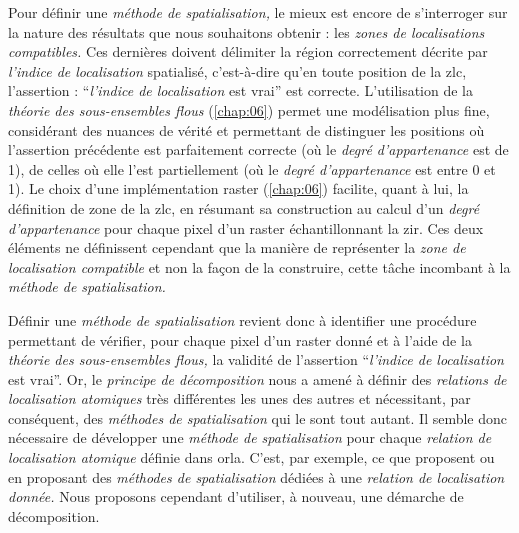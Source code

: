 Pour définir une \emph{méthode de spatialisation,} le mieux est encore
de s’interroger sur la nature des résultats que nous souhaitons
obtenir : les \emph{zones de localisations compatibles.} Ces dernières
doivent délimiter la région correctement décrite par \emph{l'indice de
  localisation} spatialisé, c'est-à-dire qu'en toute position de la
\ac{zlc}, l'assertion : \enquote{\emph{l'indice de localisation} est
  vrai} est correcte. L'utilisation de la \emph{théorie des
  sous-ensembles flous} (\autoref{chap:06}) permet une modélisation
plus fine, considérant des nuances de vérité et permettant de
distinguer les positions où l'assertion précédente est parfaitement
correcte (\ie où le \emph{degré d'appartenance} est de 1), de celles
où elle l'est partiellement (\ie où le \emph{degré d'appartenance} est
entre 0 et 1). Le choix d'une implémentation raster
(\autoref{chap:06}) facilite, quant à lui, la définition de zone de la
\ac{zlc}, en résumant sa construction au calcul d'un \emph{degré
  d'appartenance} pour chaque pixel d'un raster échantillonnant la
\ac{zir}. Ces deux éléments ne définissent cependant que la manière de
représenter la \emph{zone de localisation compatible} et non la façon
de la construire, cette tâche incombant à la \emph{méthode de
  spatialisation.}

Définir une \emph{méthode de spatialisation} revient donc à identifier
une procédure permettant de vérifier, pour chaque pixel d'un raster
donné et à l'aide de la \emph{théorie des sous-ensembles flous,} la
validité de l'assertion \enquote{\emph{l'indice de localisation} est
  vrai}. Or, le \emph{principe de décomposition} nous a amené à
définir des \emph{relations de localisation atomiques} très
différentes les unes des autres et nécessitant, par conséquent, des
\emph{méthodes de spatialisation} qui le sont tout autant. Il semble
donc nécessaire de développer une \emph{méthode de spatialisation}
pour chaque \emph{relation de localisation atomique} définie dans
\ac{orla}. C'est, par exemple, ce que proposent \textcite{Vanegas2011}
ou \textcite{Takemura2012} en proposant des \emph{méthodes de
  spatialisation} dédiées à une \emph{relation de localisation
  donnée.} Nous proposons cependant d'utiliser, à nouveau, une
démarche de décomposition.

